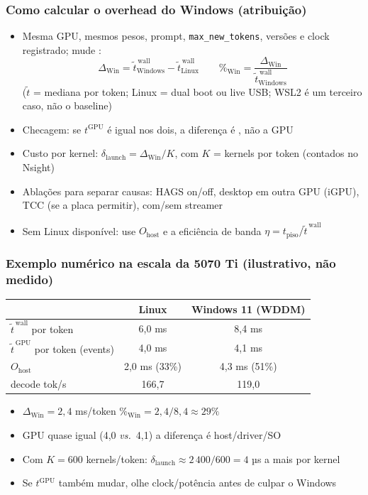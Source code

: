 \documentclass[11pt, aspectratio=169, usepdftitle=false]{beamer}
\newcommand{\vs}{\textit{vs.}\ }
\begin{document}
\begin{frame}
\frametitle{Como calcular o overhead do Windows (atribuição)}
\begin{itemize}
\item Mesma GPU, mesmos pesos, prompt, \texttt{max\_new\_tokens}, versões e clock registrado; mude :
\[ \Delta_{\text{Win}} = \tilde t^{\,\text{wall}}_{\text{Windows}} - \tilde t^{\,\text{wall}}_{\text{Linux}} \qquad \%_{\text{Win}} = \frac{\Delta_{\text{Win}}}{\tilde t^{\,\text{wall}}_{\text{Windows}}} \]
($\tilde t$ = mediana por token; Linux = dual boot ou live USB; WSL2 é um terceiro caso, não o baseline)
\item Checagem: se $t^{\text{GPU}}$ é igual nos dois, a diferença é , não a GPU
\item Custo por kernel: $\delta_{\text{launch}} = \Delta_{\text{Win}} / K$, com $K$ = kernels por token (contados no Nsight)
\item Ablações para separar causas: HAGS on/off, desktop em outra GPU (iGPU), TCC (se a placa permitir), com/sem streamer
\item Sem Linux disponível: use $O_{\text{host}}$ e a eficiência de banda $\eta = t_{\text{piso}} / \tilde t^{\,\text{wall}}$
\end{itemize}
\end{frame}

\begin{frame}
\frametitle{Exemplo numérico na escala da 5070 Ti (ilustrativo, não medido)}
\centering
\begin{tabular}{lcc}
\toprule
& Linux & Windows 11 (WDDM) \\
\midrule
$\tilde t^{\,\text{wall}}$ por token & 6,0 ms & 8,4 ms \\
$\tilde t^{\,\text{GPU}}$ por token (events) & 4,0 ms & 4,1 ms \\
$O_{\text{host}}$ & 2,0 ms (33\%) & 4,3 ms (51\%) \\
decode tok/s & 166,7 & 119,0 \\
\bottomrule
\end{tabular}
\begin{itemize}
\item $\Delta_{\text{Win}} = 2{,}4$ ms/token \so $\%_{\text{Win}} = 2{,}4/8{,}4 \approx 29\%$
\item GPU quase igual (4,0 \vs 4,1) \so a diferença é host/driver/SO
\item Com $K = 600$ kernels/token: $\delta_{\text{launch}} \approx 2\,400/600 = 4$ µs a mais por kernel
\item Se $t^{\text{GPU}}$ também mudar, olhe clock/potência antes de culpar o Windows
\end{itemize}
\end{frame}
\end{document}
